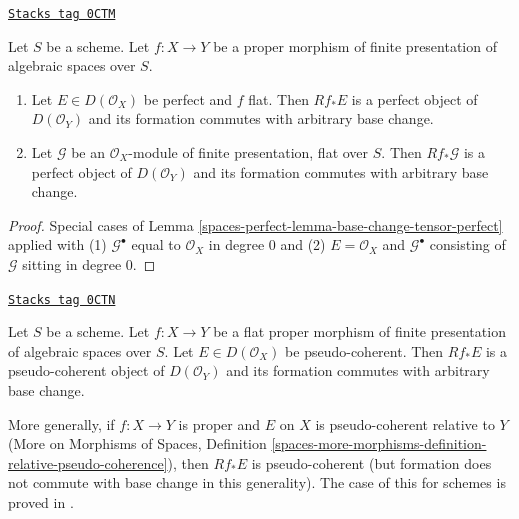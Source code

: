 \begin{lemma}
\label{spaces-perfect-lemma-flat-proper-perfect-direct-image-general}
\href{https://stacks.math.columbia.edu/tag/0CTM}{\texttt{Stacks tag 0CTM}}

Let $S$ be a scheme. Let $f : X \to Y$ be a proper
morphism of finite presentation of algebraic spaces over $S$.
\begin{enumerate}
\item Let $E \in D(\mathcal{O}_X)$ be perfect and $f$ flat. Then
$Rf_*E$ is a perfect object of $D(\mathcal{O}_Y)$ and its formation
commutes with arbitrary base change.
\item Let $\mathcal{G}$ be an $\mathcal{O}_X$-module of finite presentation,
flat over $S$. Then $Rf_*\mathcal{G}$ is a perfect object of
$D(\mathcal{O}_Y)$ and its formation commutes with arbitrary base change.
\end{enumerate}
\end{lemma}

\begin{proof}
Special cases of
Lemma \ref{spaces-perfect-lemma-base-change-tensor-perfect} applied with
(1) $\mathcal{G}^\bullet$ equal to $\mathcal{O}_X$ in degree $0$
and (2) $E = \mathcal{O}_X$ and $\mathcal{G}^\bullet$ consisting
of $\mathcal{G}$ sitting in degree $0$.
\end{proof}

\begin{lemma}
\label{spaces-perfect-lemma-flat-proper-pseudo-coherent-direct-image-general}
\href{https://stacks.math.columbia.edu/tag/0CTN}{\texttt{Stacks tag 0CTN}}

Let $S$ be a scheme. Let $f : X \to Y$ be a flat proper
morphism of finite presentation of algebraic spaces over $S$.
Let $E \in D(\mathcal{O}_X)$
be pseudo-coherent. Then $Rf_*E$ is a pseudo-coherent object of
$D(\mathcal{O}_Y)$ and its formation commutes with arbitrary base change.
\end{lemma}

More generally, if $f : X \to Y$ is proper and $E$ on $X$ is pseudo-coherent
relative to $Y$ (More on Morphisms of Spaces, Definition
\ref{spaces-more-morphisms-definition-relative-pseudo-coherence}),
then $Rf_*E$ is pseudo-coherent
(but formation does not commute with base change in this generality).
The case of this for schemes is proved in \cite{Kiehl}.

